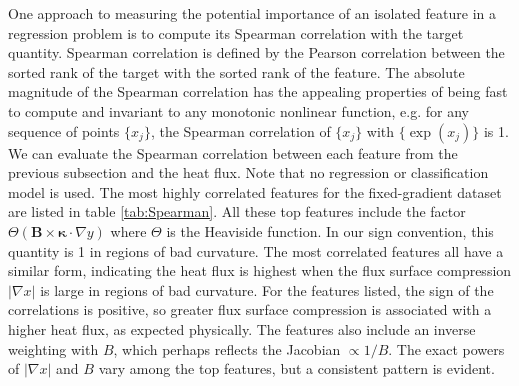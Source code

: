 \documentclass{jpp}
\begin{document}
One approach to measuring the potential importance of an isolated feature in a regression problem is to compute its Spearman correlation with the target quantity.
Spearman correlation is defined by the Pearson correlation between the sorted rank of the target with the sorted rank of the feature.
The absolute magnitude of the Spearman correlation has the appealing properties of being fast to compute and invariant to any monotonic nonlinear function, e.g. for any sequence of points $\{x_j\}$, the Spearman correlation of $\{x_j\}$ with $\{\exp(x_j)\}$ is 1.
We can evaluate the Spearman correlation between each feature from the previous subsection and the heat flux.
Note that no regression or classification model is used.
The most highly correlated features for the fixed-gradient dataset are listed in table \ref{tab:Spearman}.
All these top features include the factor $\Theta(\mathbf{B}\times\mathbf{\kappa}\cdot\nabla y)$ where $\Theta$ is the Heaviside function.
In our sign convention, this quantity is 1 in regions of bad curvature.
The most correlated features all have a similar form, indicating the heat flux is highest when the flux surface compression $|\nabla x|$ is large in regions of bad curvature.
For the features listed, the sign of the correlations is positive, so greater flux surface compression is associated with a higher heat flux, as expected physically.
The features also include an inverse weighting with $B$, which perhaps reflects the Jacobian $\propto 1/B$.
The exact powers of $|\nabla x|$ and $B$ vary among the top features, but a consistent pattern is evident.
\end{document}

